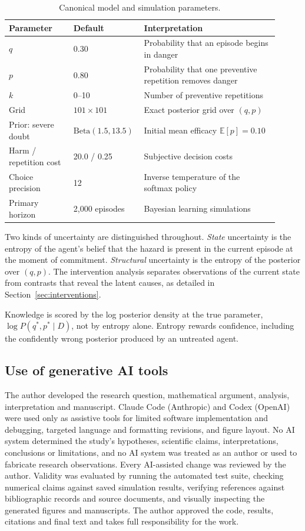 \documentclass[11pt]{article}
\begin{document}
\begin{table}[t]
\centering
\small
\begin{tabular}{p{0.23\linewidth}p{0.20\linewidth}p{0.48\linewidth}}
\toprule
Parameter & Default & Interpretation \\
\midrule
$q$ & 0.30 & Probability that an episode begins in danger \\
$p$ & 0.80 & Probability that one preventive repetition removes danger \\
$k$ & 0--10 & Number of preventive repetitions \\
Grid & $101\times101$ & Exact posterior grid over $(q,p)$ \\
Prior: severe doubt & $\mathrm{Beta}(1.5,13.5)$ & Initial mean efficacy $\mathbb{E}[p]=0.10$ \\
Harm / repetition cost & 20.0 / 0.25 & Subjective decision costs \\
Choice precision & 12 & Inverse temperature of the softmax policy \\
Primary horizon & 2,000 episodes & Bayesian learning simulations \\
\bottomrule
\end{tabular}
\caption{Canonical model and simulation parameters.}
\label{tab:params}
\end{table}

Two kinds of uncertainty are distinguished throughout. \emph{State} uncertainty is
the entropy of the agent's belief that the hazard is present in the current
episode at the moment of commitment. \emph{Structural} uncertainty is the entropy
of the posterior over $(q,p)$. The intervention analysis separates observations
of the current state from contrasts that reveal the latent causes, as detailed in
Section~\ref{sec:interventions}.

Knowledge is scored by the log posterior density at the true parameter,
$\log P(q^\ast,p^\ast \mid D)$, not by entropy alone. Entropy rewards confidence,
including the confidently wrong posterior produced by an untreated agent.

\subsection{Use of generative AI tools}

The author developed the research question, mathematical argument, analysis,
interpretation and manuscript. Claude Code (Anthropic) and Codex (OpenAI) were
used only as assistive tools for limited software implementation and debugging,
targeted language and formatting revisions, and figure layout. No AI system
determined the study's hypotheses, scientific claims, interpretations,
conclusions or limitations, and no AI system was treated as an author or used to
fabricate research observations. Every AI-assisted change was reviewed by the
author. Validity was evaluated by running the automated test suite, checking
numerical claims against saved simulation results, verifying references against
bibliographic records and source documents, and visually inspecting the generated
figures and manuscripts. The author approved the code, results, citations and
final text and takes full responsibility for the work.
\end{document}
